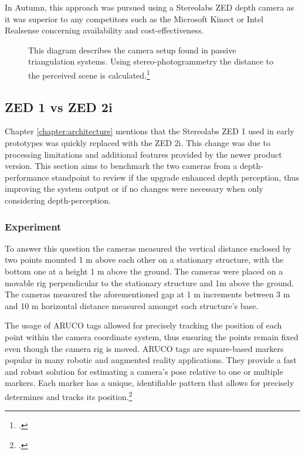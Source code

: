 In Autumn, this approach was pursued using a Stereolabs ZED depth camera as it was superior to any competitors such as the Microsoft Kinect or Intel Realsense concerning availability and cost-effectiveness. 

\begin{figure}
	\centering
	
	\caption{
		This diagram describes the camera setup found in passive triangulation systems. Using stereo-photogrammetry the distance to the perceived scene is calculated.\footcite{altuntas2021triangulation}
	}
	\label{fig:passiveTriangulation}
\end{figure}

\subsection{ZED 1 vs ZED 2i}
Chapter \ref{chapter:architecture} mentions that the Stereolabs ZED 1 used in early prototypes was quickly replaced with the ZED 2i. This change was due to processing limitations and additional features provided by the newer product version.
This section aims to benchmark the two cameras from a depth-performance standpoint to review if the upgrade enhanced depth perception, thus improving the system output or if no changes were necessary when only considering depth-perception.

\subsubsection{Experiment}
To answer this question the cameras measured the vertical distance enclosed by two points mounted 1 m above each other on a stationary structure, with the bottom one at a height 1 m above the ground. 
The cameras were placed on a movable rig perpendicular to the stationary structure and 1m above the ground.  The cameras measured the aforementioned gap at 1 m increments between 3 m and 10 m horizontal distance measured amongst each structure's base. 

The usage of ARUCO tags allowed for precisely tracking the position of each point within the camera coordinate system, thus ensuring the points remain fixed even though the camera rig is moved. 
ARUCO tags are square-based markers popular in many robotic and augmented reality applications. They provide a fast and robust solution for estimating a camera's pose relative to one or multiple markers. Each marker has a unique, identifiable pattern that allows for precisely determines and tracks its position.\footcite{jurado2015} 

